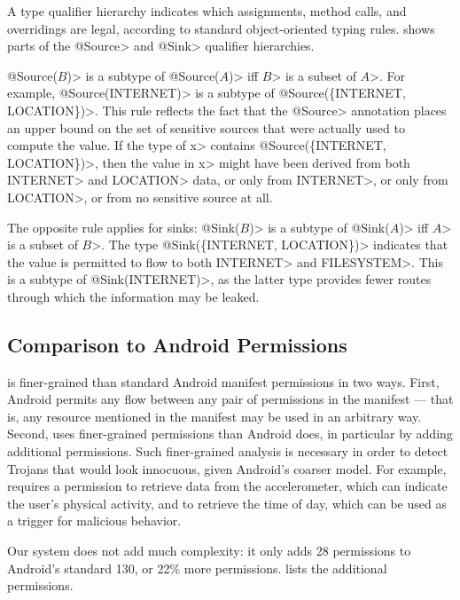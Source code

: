 A type qualifier hierarchy indicates
which assignments, method calls, and overridings are legal, according to
standard object-oriented typing rules.
 shows parts of the \<@Source> and
\<@Sink> qualifier hierarchies.


\<@Source($B$)> is a subtype of \<@Source($A$)> iff \<$B$> is a subset of \<$A$>.
For example, \<@Source(INTERNET)> is a subtype of \<@Source(\{INTERNET, LOCATION\})>.
This rule reflects the fact that the \<@Source> annotation
places an upper bound on the set of sensitive sources that were actually
used to compute the value.
If the type of \<x> contains \<@Source(\{INTERNET, LOCATION\})>, then the value
in \<x> might have been derived from both \<INTERNET> and \<LOCATION> data, or
only from \<INTERNET>, or only from \<LOCATION>, or from no
sensitive source at all.

The opposite rule applies for sinks:
\<@Sink($B$)> is a subtype of \<@Sink($A$)> iff \<$A$> is a subset of \<$B$>.
The type \<@Sink(\{INTERNET, LOCATION\})> indicates that
the value is permitted to flow to both \<INTERNET> and \<FILESYSTEM>.  This
is a subtype of \<@Sink(INTERNET)>, as the latter type provides fewer routes through which the information may be
leaked.




\subsection{Comparison to Android Permissions}
\label{sec:permissions}


\TheFlowChecker is finer-grained than standard Android manifest permissions
in two ways.  First, Android permits any flow
between any pair of permissions in the manifest --- that is, any resource
mentioned in the manifest may be used in an arbitrary way.  Second,
\theFlowChecker uses finer-grained permissions than Android does, in
particular by adding additional permissions.
Such finer-grained analysis is necessary in order to detect Trojans that would 
look innocuous, given Android's coarser model.
For example, \theFlowChecker requires 
a permission to retrieve data from the accelerometer, which can indicate the user's
physical activity, and to retrieve the time of day, which can be used
as a trigger for malicious behavior.

Our system does not add much complexity:  it only adds 28 permissions to
Android's standard 130, or 22\% more permissions.   lists
the additional permissions.

